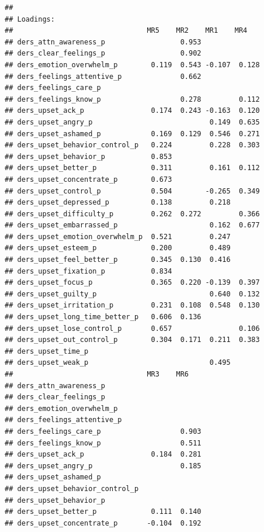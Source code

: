 \documentclass[
]{book}
\begin{document}
\begin{verbatim}
## 
## Loadings:
##                                MR5    MR2    MR1    MR4   
## ders_attn_awareness_p                  0.953              
## ders_clear_feelings_p                  0.902              
## ders_emotion_overwhelm_p        0.119  0.543 -0.107  0.128
## ders_feelings_attentive_p              0.662              
## ders_feelings_care_p                                      
## ders_feelings_know_p                   0.278         0.112
## ders_upset_ack_p                0.174  0.243 -0.163  0.120
## ders_upset_angry_p                            0.149  0.635
## ders_upset_ashamed_p            0.169  0.129  0.546  0.271
## ders_upset_behavior_control_p   0.224         0.228  0.303
## ders_upset_behavior_p           0.853                     
## ders_upset_better_p             0.311         0.161  0.112
## ders_upset_concentrate_p        0.673                     
## ders_upset_control_p            0.504        -0.265  0.349
## ders_upset_depressed_p          0.138         0.218       
## ders_upset_difficulty_p         0.262  0.272         0.366
## ders_upset_embarrassed_p                      0.162  0.677
## ders_upset_emotion_overwhelm_p  0.521         0.247       
## ders_upset_esteem_p             0.200         0.489       
## ders_upset_feel_better_p        0.345  0.130  0.416       
## ders_upset_fixation_p           0.834                     
## ders_upset_focus_p              0.365  0.220 -0.139  0.397
## ders_upset_guilty_p                           0.640  0.132
## ders_upset_irritation_p         0.231  0.108  0.548  0.130
## ders_upset_long_time_better_p   0.606  0.136              
## ders_upset_lose_control_p       0.657                0.106
## ders_upset_out_control_p        0.304  0.171  0.211  0.383
## ders_upset_time_p                                         
## ders_upset_weak_p                             0.495       
##                                MR3    MR6   
## ders_attn_awareness_p                       
## ders_clear_feelings_p                       
## ders_emotion_overwhelm_p                    
## ders_feelings_attentive_p                   
## ders_feelings_care_p                   0.903
## ders_feelings_know_p                   0.511
## ders_upset_ack_p                0.184  0.281
## ders_upset_angry_p                     0.185
## ders_upset_ashamed_p                        
## ders_upset_behavior_control_p               
## ders_upset_behavior_p                       
## ders_upset_better_p             0.111  0.140
## ders_upset_concentrate_p       -0.104  0.192

\end{verbatim}
\end{document}
